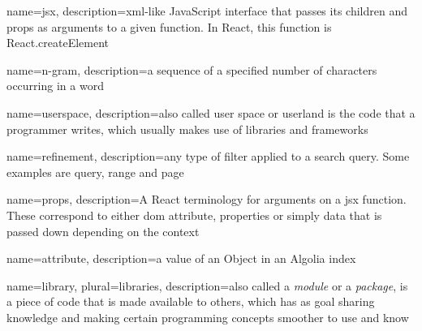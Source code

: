 
{
  name=jsx,
  description={\acrshort{xml}-like JavaScript interface that passes its children and props as arguments to a given function. In React, this function is React.createElement}
}
 
{
  name={n-gram},
  description={a sequence of a specified number of characters occurring in a word\cite{kimbrell1988searching}}
}
 
{
  name=userspace,
  description={also called user space or userland is the code that a programmer writes, which usually makes use of libraries and frameworks}
}

{
  name=refinement,
  description={any type of filter applied to a search query. Some examples are query, range and page}
}

{
  name=props,
  description={A React terminology for arguments on a \gls{jsx} function. These correspond to either \acrshort{dom} attribute, properties or simply data that is passed down depending on the context}
}

{
  name=attribute,
  description={a value of an Object in an Algolia index}
}

{
  name=library,
  plural=libraries,
  description={also called a \emph{module} or a \emph{package}, is a piece of code that is made available to others, which has as goal sharing knowledge and making certain programming concepts smoother to use and know}
}

